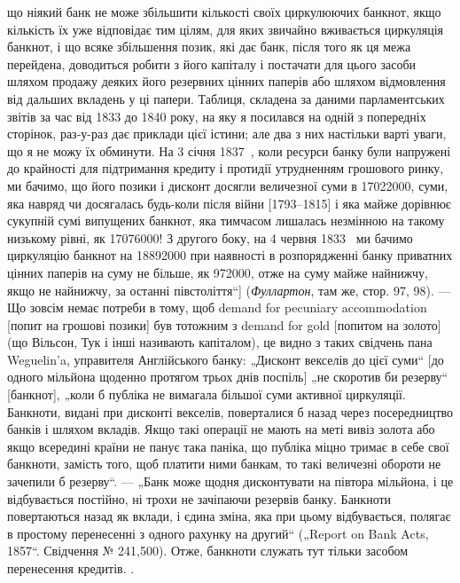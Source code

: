 {що ніякий банк не може збільшити кількості своїх циркулюючих банкнот,
якщо кількість їх уже відповідає тим цілям, для яких звичайно вживається циркуляція
банкнот, і що всяке збільшення позик, які дає банк, після того як ця межа
перейдена, доводиться робити з його капіталу і постачати для цього засоби
шляхом продажу деяких його резервних цінних паперів або шляхом відмовлення
від дальших вкладень у ці папери. Таблиця, складена за даними парламентських
звітів за час від 1833 до 1840 року, на яку я посилався на одній з попередніх
сторінок, раз-у-раз дає приклади цієї істини; але два з них настільки варті уваги,
що я не можу їх обминути. На 3 січня 1837~, коли ресурси банку були
напружені до крайності для підтримання кредиту і протидії утрудненням
грошового ринку, ми бачимо, що його позики і дисконт досягли величезної
суми в \num{17022000}, суми, яка навряд чи досягалась будь-коли
після війни [1793--1815] і яка майже дорівнює сукупній сумі випущених
банкнот, яка тимчасом лишалась незмінною на такому низькому рівні,
як \num{17076000}! З другого боку, на 4 червня 1833~ ми бачимо
циркуляцію банкнот на \num{18892000} при наявності в розпорядженні
банку приватних цінних паперів на суму не більше, як \num{972000}, отже на суму майже найнижчу, якщо не найнижчу, за останні
півстоліття“] (\emph{Фуллартон}, там же, стор. 97, 98). — Що зовсім немає потреби
в тому, щоб demand for pecuniary accommodation [попит на грошові позики] був
тотожним з demand for gold [попитом на золото] (що Вільсон, Тук і інші називають
капіталом), це видно з таких свідчень пана Weguelin’a, управителя Англійського
банку: „Дисконт векселів до цієї суми“ [до одного мільйона щоденно
протягом трьох днів поспіль] „не скоротив би резерву“ [банкнот], „коли б публіка
не вимагала більшої суми активної циркуляції. Банкноти, видані при
дисконті векселів, поверталися б назад через посередництво банків і шляхом
вкладів. Якщо такі операції не мають на меті вивіз золота або якщо всередині
країни не панує така паніка, що публіка міцно тримає в себе свої банкноти,
замість того, щоб платити ними банкам, то такі величезні обороти не зачепили б
резерву“. — „Банк може щодня дисконтувати на півтора мільйона, і це відбувається
постійно, ні трохи не зачіпаючи резервів банку. Банкноти повертаються
назад як вклади, і єдина зміна, яка при цьому відбувається, полягає в простому
перенесенні з одного рахунку на другий“ („Report on Bank Acts, 1857“. Свідчення
№ 241,500). Отже, банкноти служать тут тільки засобом перенесення кредитів.
}.

